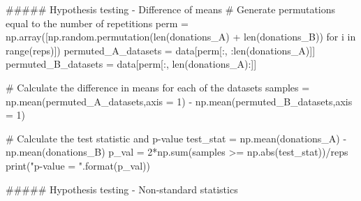 ##### Hypothesis testing - Difference of means
# Generate permutations equal to the number of repetitions
perm = np.array([np.random.permutation(len(donations_A) + len(donations_B)) for i in range(reps)])
permuted_A_datasets = data[perm[:, :len(donations_A)]]
permuted_B_datasets = data[perm[:, len(donations_A):]]

# Calculate the difference in means for each of the datasets
samples = np.mean(permuted_A_datasets,axis = 1) - np.mean(permuted_B_datasets,axis = 1)

# Calculate the test statistic and p-value
test_stat = np.mean(donations_A) - np.mean(donations_B)
p_val = 2*np.sum(samples >= np.abs(test_stat))/reps
print("p-value = {}".format(p_val))

##### Hypothesis testing - Non-standard statistics

